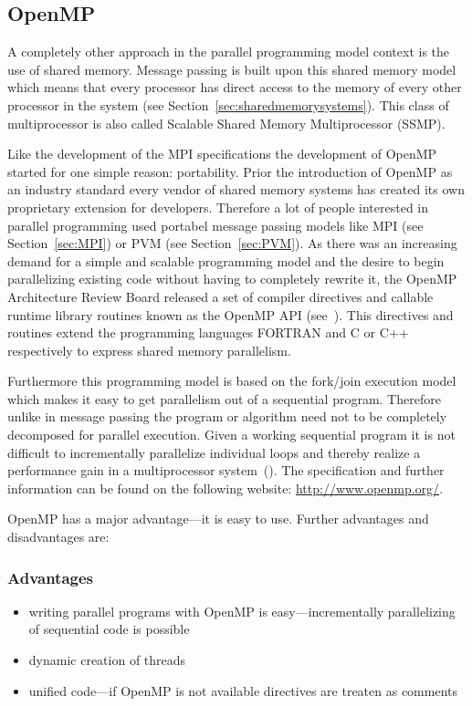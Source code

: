 \subsection{OpenMP}
\label{sec:OpenMP}

A completely other approach in the parallel programming model context
is the use of shared memory. Message passing is built upon this shared
memory model which means that every processor has direct access to the
memory of every other processor in the system
(see Section~\ref{sec:sharedmemorysystems}). This class of
multiprocessor is also called Scalable Shared Memory Multiprocessor
(SSMP).

Like the development of the MPI specifications the development
of OpenMP started for one simple reason: portability. Prior the
introduction of OpenMP as an industry standard every vendor of shared
memory systems has created its own proprietary extension for
developers. Therefore a lot of people interested in parallel
programming used portabel message passing models like MPI (see
Section~\ref{sec:MPI}) or PVM (see Section~\ref{sec:PVM}). As there
was an increasing demand for a simple and scalable programming model and
the desire to begin parallelizing existing code without having to
completely rewrite it, the OpenMP Architecture Review Board released a
set of compiler directives and callable runtime library routines
known as the OpenMP API (see~\cite{openMP05}). This directives and
routines extend the
programming languages FORTRAN and C or C++ respectively to express
shared memory parallelism.

Furthermore this programming model is based on the fork/join execution
model which makes it easy to get parallelism out of a sequential
program. Therefore unlike in message passing the program or algorithm
need not to be completely decomposed for parallel execution. Given a
working sequential program it is not difficult to incrementally
parallelize individual loops and thereby realize a performance gain in
a multiprocessor system~(\cite{dagum1997opi}). The specification and
further information can be found on the following website:
\url{http://www.openmp.org/}.


OpenMP has a major advantage---it is easy to use. Further advantages
and disadvantages are:

\subsubsection{Advantages}

\begin{itemize}
\item writing parallel programs with OpenMP is easy---incrementally
  parallelizing of sequential code is possible
\item dynamic creation of threads
\item unified code---if OpenMP is not available directives are
  treaten as comments 
\end{itemize}

